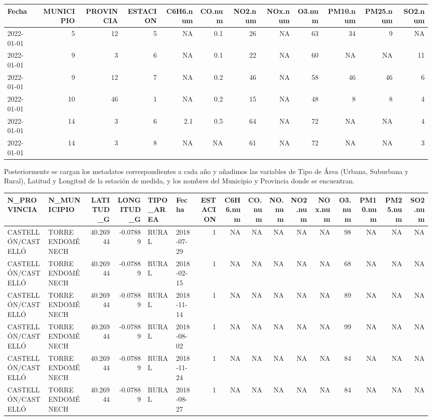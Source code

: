\documentclass[notspecified,article,submit,moreauthors,pdftex]{Definitions/mdpi}
\begin{document}
\begin{tabular}{l|r|r|r|r|r|r|r|r|r|r|r}
\hline
Fecha & MUNICIPIO & PROVINCIA & ESTACION & C6H6.num & CO.num & NO2.num & NOx.num & O3.num & PM10.num & PM25.num & SO2.num\\
\hline
2022-01-01 & 5 & 12 & 5 & NA & 0.1 & 26 & NA & 63 & 34 & 9 & NA\\
\hline
2022-01-01 & 9 & 3 & 6 & NA & 0.1 & 22 & NA & 60 & NA & NA & 11\\
\hline
2022-01-01 & 9 & 12 & 7 & NA & 0.2 & 46 & NA & 58 & 46 & 46 & 6\\
\hline
2022-01-01 & 10 & 46 & 1 & NA & 0.2 & 15 & NA & 48 & 8 & 8 & 4\\
\hline
2022-01-01 & 14 & 3 & 6 & 2.1 & 0.5 & 64 & NA & 72 & NA & NA & 4\\
\hline
2022-01-01 & 14 & 3 & 8 & NA & NA & 61 & NA & 72 & NA & NA & 3\\
\hline
\end{tabular}

Posteriormente se cargan los metadatos correspondientes a cada año y
añadimos las variables de Tipo de Área (Urbana, Suburbana y Rural),
Latitud y Longitud de la estación de medida, y los nombres del Municipio
y Provincia donde se encuentran.

\begin{tabular}{l|l|r|r|l|l|r|r|r|r|r|r|r|r|r|r}
\hline
N\_PROVINCIA & N\_MUNICIPIO & LATITUD\_G & LONGITUD\_G & TIPO\_AREA & Fecha & ESTACION & C6H6.num & CO.num & NO.num & NO2.num & NOx.num & O3.num & PM10.num & PM25.num & SO2.num\\
\hline
CASTELLÓN/CASTELLÓ & TORRE ENDOMÉNECH & 40.26944 & -0.07889 & RURAL & 2018-07-29 & 1 & NA & NA & NA & NA & NA & 98 & NA & NA & NA\\
\hline
CASTELLÓN/CASTELLÓ & TORRE ENDOMÉNECH & 40.26944 & -0.07889 & RURAL & 2018-02-15 & 1 & NA & NA & NA & NA & NA & 68 & NA & NA & NA\\
\hline
CASTELLÓN/CASTELLÓ & TORRE ENDOMÉNECH & 40.26944 & -0.07889 & RURAL & 2018-11-14 & 1 & NA & NA & NA & NA & NA & 89 & NA & NA & NA\\
\hline
CASTELLÓN/CASTELLÓ & TORRE ENDOMÉNECH & 40.26944 & -0.07889 & RURAL & 2018-08-02 & 1 & NA & NA & NA & NA & NA & 99 & NA & NA & NA\\
\hline
CASTELLÓN/CASTELLÓ & TORRE ENDOMÉNECH & 40.26944 & -0.07889 & RURAL & 2018-11-24 & 1 & NA & NA & NA & NA & NA & 84 & NA & NA & NA\\
\hline
CASTELLÓN/CASTELLÓ & TORRE ENDOMÉNECH & 40.26944 & -0.07889 & RURAL & 2018-08-27 & 1 & NA & NA & NA & NA & NA & 84 & NA & NA & NA\\
\hline
\end{tabular}
\end{document}
